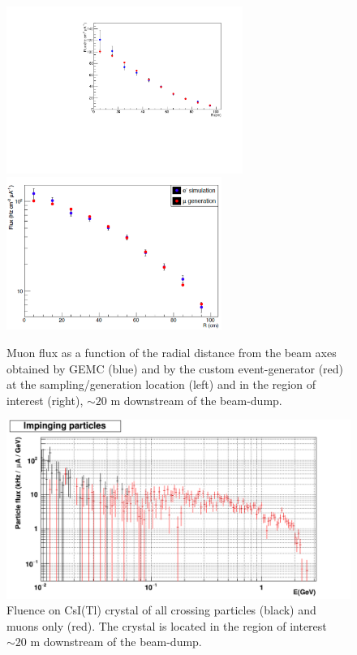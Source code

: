 \begin{figure}[h!] 
\center
\includegraphics[width=7.7cm]{figs/SimVSGen.pdf}
\includegraphics[width=7.0cm]{figs/mu-comp-far.pdf}
\caption{Muon flux as a function of the radial  distance from the beam axes obtained by GEMC (blue) and by the custom event-generator (red) at the sampling/generation location (left) and in the region of interest (right), $\sim 20$ m downstream of the beam-dump.}
\label{fig:mu-sampling-extract} 
\end{figure}


\begin{figure}[h!] 
\center
\includegraphics[width=15cm]{figs/fig10.pdf}    
\caption{Fluence  on  CsI(Tl) crystal of  all crossing particles (black) and muons only (red). The crystal is located in the region of interest $\sim 20$ m downstream of the beam-dump. }
\label{fig:bg-csi}
\end{figure}

